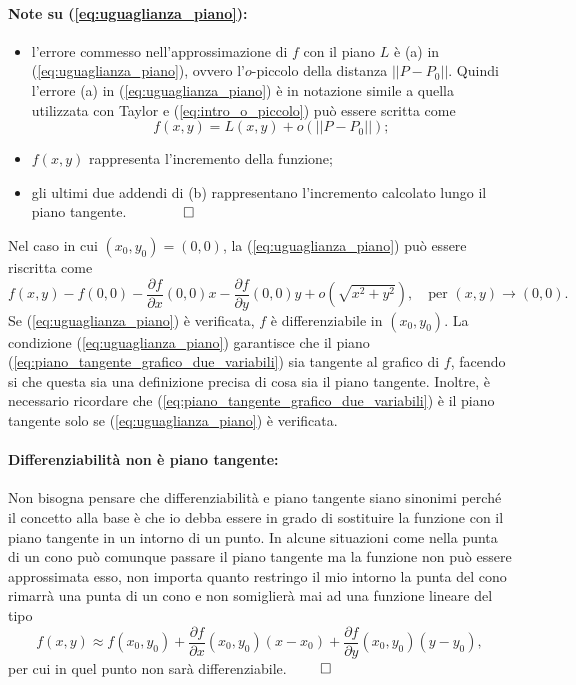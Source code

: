 
\paragraph{Note su (\ref{eq:uguaglianza_piano}):}
\begin{itemize}
	\item l'errore commesso nell'approssimazione di $f$ con il piano $L$ è (a) in (\ref{eq:uguaglianza_piano}), ovvero l'$o$-piccolo della distanza $||P-P_0||$. Quindi l'errore (a) in (\ref{eq:uguaglianza_piano}) è in notazione simile a quella utilizzata con Taylor e (\ref{eq:intro_o_piccolo}) può essere scritta come
	\begin{equation*}
		f(x,y) = L(x,y) + o(||P-P_0||);
	\end{equation*}
	\item $f(x,y)$ rappresenta l'incremento della funzione;
	\item gli ultimi due addendi di (b) rappresentano l'incremento calcolato lungo il piano tangente.$\qquad\boldsymbol{\qed}$
\end{itemize}

\noindent Nel caso in cui $(x_0,y_0) = (0,0)$, la (\ref{eq:uguaglianza_piano}) può essere riscritta come
\begin{equation*}
	f(x,y) - f(0,0) - \frac{\partial f}{\partial x} (0, 0)x - \frac{\partial f}{\partial y} (0,0) y + o(\sqrt{x^2+y^2}),\quad\text{per } (x,y)\rightarrow(0,0).
\end{equation*}
Se (\ref{eq:uguaglianza_piano}) è verificata, $f$ è differenziabile in $(x_0,y_0)$. La condizione (\ref{eq:uguaglianza_piano}) garantisce che il piano (\ref{eq:piano_tangente_grafico_due_variabili}) sia tangente al grafico di $f$, facendo si che questa sia una definizione precisa di cosa sia il piano tangente. Inoltre, è necessario ricordare che (\ref{eq:piano_tangente_grafico_due_variabili}) è il piano tangente solo se (\ref{eq:uguaglianza_piano}) è verificata.

\paragraph{Differenziabilità non è piano tangente: } Non bisogna pensare che differenziabilità e piano tangente siano sinonimi perché il concetto alla base è che io debba essere in grado di sostituire la funzione con il piano tangente in un intorno di un punto. In alcune situazioni come nella punta di un cono può comunque passare il piano tangente ma la funzione non può essere approssimata esso, non importa quanto restringo il mio intorno la punta del cono rimarrà una punta di un cono e non somiglierà mai ad una funzione lineare del tipo
\begin{equation*}
	f(x,y)\approx f(x_0,y_0) + \frac{\partial f}{\partial x}(x_0, y_0)(x-x_0)+\frac{\partial f}{\partial y}(x_0, y_0)(y-y_0),
\end{equation*}
per cui in quel punto non sarà differenziabile. $\qed$

